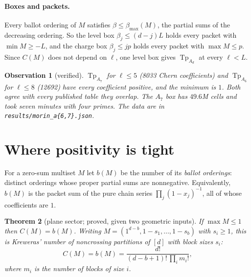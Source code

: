 \documentclass[11pt,a4paper]{article}
\DeclareMathOperator{\Tp}{Tp}
\theoremstyle{plain}
\newtheorem{theorem}{Theorem}
\newtheorem{observation}[theorem]{Observation}
\theoremstyle{definition}
\theoremstyle{remark}
\begin{document}
\paragraph{Boxes and packets.} Every ballot ordering of $M$ satisfies $\beta \le \beta_{\max}(M)$,
the partial sums of the decreasing ordering. So the level box $\beta_j \le (d-j)L$ holds every
packet with $\min M \ge -L$, and the charge box $\beta_j \le jp$ holds every packet with $\max M \le
p$. Since $C(M)$ does not depend on $\ell$, one level box gives $\Tp_{A_d}$ at every $\ell < L$.

\begin{observation}[verified]
$\Tp_{A_7}$ for $\ell \le 5$ (8033 Chern coefficients) and $\Tp_{A_6}$ for $\ell \le 8$ (12692) have
every coefficient positive, and the minimum is $1$. Both agree with every published table they
overlap. The $A_7$ box has $49.6$M cells and took seven minutes with four primes. The data are in
\texttt{results/morin\_a\{6,7\}.json}.
\end{observation}

\section{Where positivity is tight}\label{sec:tight}

For a zero-sum multiset $M$ let $b(M)$ be the number of its \emph{ballot orderings}: distinct
orderings whose proper partial sums are nonnegative. Equivalently, $b(M)$ is the packet sum of the
pure chain series $\prod_j (1-x_j)^{-1}$, all of whose coefficients are $1$.

\begin{theorem}[plane sector; proved, given two geometric inputs]\label{thm:plane}
If $\max M \le 1$ then $C(M) = b(M)$. Writing $M = (1^{d-b}, 1-s_1, \dots, 1-s_b)$ with $s_i \ge 1$,
this is Kreweras' number of noncrossing partitions of $[d]$ with block sizes $s_i$:
\[
  C(M) = b(M) = \frac{d!}{(d-b+1)!\,\prod_i m_i!},
\]
where $m_i$ is the number of blocks of size $i$.
\end{theorem}
\end{document}
